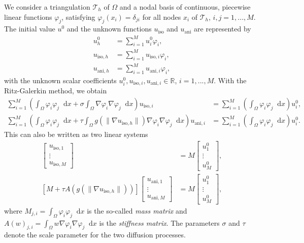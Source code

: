 \documentclass{report}
\renewcommand*\d{\mathop{}\!\mathrm{d}}
\renewcommand\phi{\varphi}
\def\R{\mathbb{R}}
\def\T{\mathcal{T}}
\def\iso{\text{iso}}
\def\ani{\text{ani}}
\begin{document}
We consider a triangulation $\T_h$ of $\Omega$ and a nodal basis of continuous, piecewise linear functions $\phi_j$, satisfying $\phi_j(x_i) = \delta_{ji}$ for all nodes $x_i$ of $\T_h$, $i,j=1,...,M$. The initial value $u^0$ and the unknown functions $u_\iso$ and $u_\ani$ are represented by
\begin{align}
	u^0_h & = \sum_{i=1}^{M} u^0_i \phi_i, \\
	u_{\iso, h} &= \sum_{i=1}^{M} u_{\iso, i} \phi_i, \\
	u_{\ani, h} &= \sum_{i=1}^{M} u_{\ani, i} \phi_i,
\end{align}
with the unknown scalar coefficients $u^0_i, u_{\iso, i}, u_{\ani, i} \in \R$, $i=1,...,M$. With the Ritz-Galerkin method, we obtain
\begin{align}
	\sum_{i=1}^{M} \left( \int_\Omega \phi_i \phi_j \d x + \sigma \int_\Omega \nabla \phi_i \nabla \phi_j \d x \right) u_{\iso, i} &= \sum_{i=1}^{M} \left( \int_\Omega \phi_i \phi_j \d x \right) u^0_i, \\
	\sum_{i=1}^{M} \left( \int_\Omega \phi_i \phi_j \d x + \tau \int_\Omega g(\|\nabla u_{\iso,h}\|) \nabla \phi_i \nabla \phi_j \d x \right) u_{\ani, i} &= \sum_{i=1}^{M} \left( \int_\Omega \phi_i \phi_j \d x \right) u^0_i.
\end{align}
This can also be written as two linear systems
\begin{align}
	[M + \sigma A(1)] \begin{bmatrix}u_{\iso,1}\\\vdots\\u_{\iso,M}\end{bmatrix} &= M \begin{bmatrix}u^0_1\\\vdots\\u^0_M\end{bmatrix}, \\
	[M + \tau A(g(\|\nabla u_{\iso,h}\|))] \begin{bmatrix}u_{\ani,1}\\\vdots\\u_{\ani,M}\end{bmatrix} &= M \begin{bmatrix}u^0_1\\\vdots\\u^0_M\end{bmatrix},
\end{align}
where $M_{j,i} = \int_\Omega \phi_i \phi_j \d x$ is the so-called \emph{mass matrix} and $A(w)_{j,i} = \int_\Omega w \nabla \phi_i \nabla \phi_j \d x$ is the \emph{stiffness matrix}. The parameters $\sigma$ and $\tau$ denote the scale parameter for the two diffusion processes.
\end{document}
